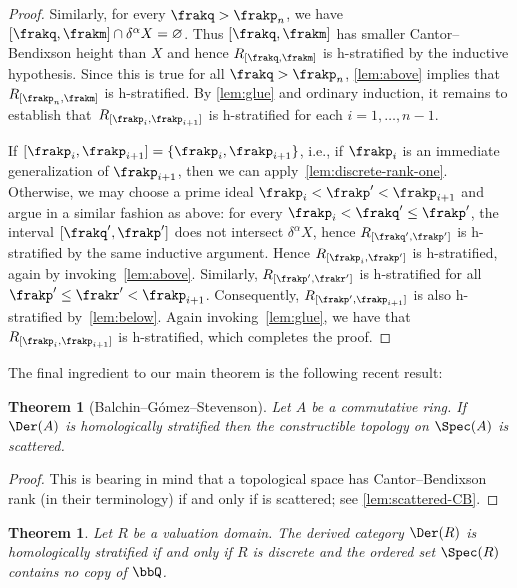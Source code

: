 \documentclass{amsart}
\numberwithin{equation}{section}%
\newtheorem{Thm}[equation]{Theorem}
\theoremstyle{remark}
\renewcommand{\emptyset}{\varnothing}
\begin{document}
\begin{proof}
	Similarly, for every $\frakq > \frakp_n$, we have $[\frakq,\frakm] \cap \delta^\alpha X = \emptyset$. Thus $[\frakq,\frakm]$ has smaller Cantor--Bendixson height than $X$ and hence $R_{[\frakq,\frakm]}$ is h-stratified by the inductive hypothesis. Since this is true for all $\frakq>\frakp_n$, \cref{lem:above} implies that $R_{[\frakp_n,\frakm]}$ is h-stratified. By \cref{lem:glue} and ordinary induction, it remains to establish that~$R_{[\frakp_i,\frakp_{i+1}]}$ is h-stratified for each $i=1,\ldots,n-1$.
  
	If $[\frakp_i,\frakp_{i+1}] = \{\frakp_i,\frakp_{i+1}\}$, i.e., if $\frakp_i$ is an immediate generalization of $\frakp_{i+1}$, then we can apply~\cref{lem:discrete-rank-one}. Otherwise, we may choose a prime ideal $\frakp_i < \frakp' < \frakp_{i+1}$ and argue in a similar fashion as above: for every $\frakp_i < \frakq' \le \frakp'$, the interval $[\frakq',\frakp']$ does not intersect $\delta^\alpha X$, hence $R_{[\frakq',\frakp']}$ is h-stratified by the same inductive argument. Hence $R_{[\frakp_i,\frakp']}$ is h-stratified, again by invoking~\cref{lem:above}. Similarly, $R_{[\frakp',\frakr']}$ is h-stratified for all $\frakp' \le \frakr' < \frakp_{i+1}$. Consequently, $R_{[\frakp',\frakp_{i+1}]}$ is also h-stratified by~\cref{lem:below}. Again invoking~\cref{lem:glue}, we have that $R_{[\frakp_i,\frakp_{i+1}]}$ is h-stratified, which completes the proof.
\end{proof}

The final ingredient to our main theorem is the following recent result:

\begin{Thm}[Balchin--G\'{o}mez--Stevenson]\label{thm:BGS}%
  Let $A$ be a commutative ring. If $\Der(A)$ is homologically stratified then the constructible topology on $\Spec(A)$ is scattered.
\end{Thm}

\begin{proof}
	This is \cite[Theorem~5.3]{BalchinGomezStevenson26pp} bearing in mind that a topological space has Cantor--Bendixson rank (in their terminology) if and only if is scattered; see \cref{lem:scattered-CB}.
\end{proof}

\begin{Thm}\label{thm:h-stratification}
	Let $R$ be a valuation domain. The derived category $\Der(R)$ is homologically stratified if and only if $R$ is discrete and the ordered set $\Spec(R)$ contains no copy of $\bbQ$.
\end{Thm}
\end{document}
